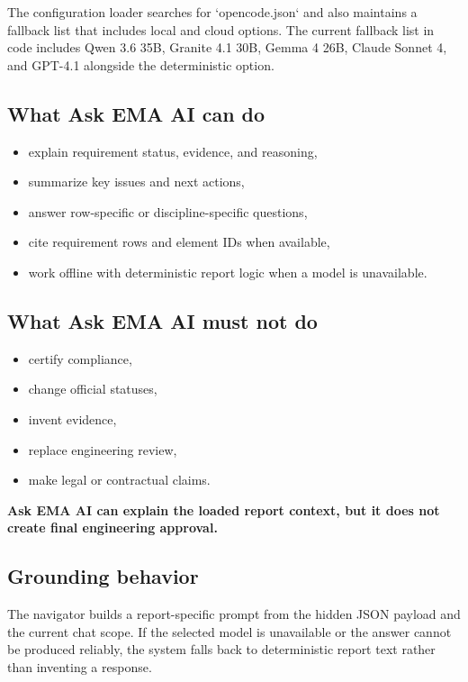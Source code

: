 \documentclass[10pt,letterpaper]{article}
\newcommand{\strong}[1]{\textbf{\textcolor{emaNavy}{#1}}}
\newcommand{\guardrailbox}[1]{%
\begin{tcolorbox}[colback=guardrailBlue,colframe=guardrailBorder,boxrule=0.6pt,arc=2mm,
  left=10pt,right=10pt,top=8pt,bottom=8pt]
\small #1
\end{tcolorbox}}
\begin{document}
The configuration loader searches for `opencode.json` and also maintains a fallback list that includes local and cloud options. The current fallback list in code includes Qwen 3.6 35B, Granite 4.1 30B, Gemma 4 26B, Claude Sonnet 4, and GPT-4.1 alongside the deterministic option.

\subsection{What Ask EMA AI can do}

\begin{itemize}
  \item explain requirement status, evidence, and reasoning,
  \item summarize key issues and next actions,
  \item answer row-specific or discipline-specific questions,
  \item cite requirement rows and element IDs when available,
  \item work offline with deterministic report logic when a model is unavailable.
\end{itemize}

\subsection{What Ask EMA AI must not do}

\begin{itemize}
  \item certify compliance,
  \item change official statuses,
  \item invent evidence,
  \item replace engineering review,
  \item make legal or contractual claims.
\end{itemize}

\guardrailbox{\strong{Ask EMA AI can explain the loaded report context, but it does not create final engineering approval.}}

\subsection{Grounding behavior}

The navigator builds a report-specific prompt from the hidden JSON payload and the current chat scope. If the selected model is unavailable or the answer cannot be produced reliably, the system falls back to deterministic report text rather than inventing a response.
\end{document}
